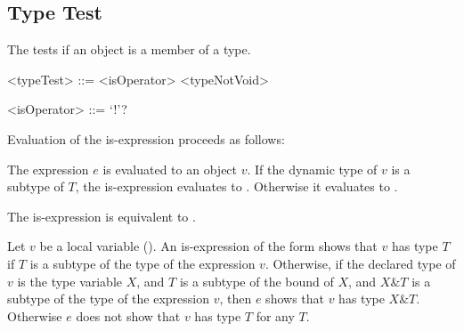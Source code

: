 \documentclass[makeidx]{article}
\begin{document}
{\subsection{Type Test}

\LMHash{}%
The  tests if an object is a member of a type.

\begin{grammar}
<typeTest> ::= <isOperator> <typeNotVoid>

<isOperator> ::= \IS{} `!'?
\end{grammar}

\LMHash{}%
Evaluation of the is-expression  proceeds as follows:

\LMHash{}%
The expression $e$ is evaluated to an object $v$.
If the dynamic type of $v$ is a subtype of $T$,
the is-expression evaluates to \TRUE.
Otherwise it evaluates to \FALSE.


\LMHash{}%
The is-expression  is equivalent to .

\LMHash{}%
Let $v$ be a local variable ().
An is-expression of the form 
shows that $v$ has type $T$
if $T$ is a subtype of the type of the expression $v$.
%
Otherwise,
if the declared type of $v$ is the type variable $X$,
and $T$ is a subtype of the bound of $X$,
and $X \& T$ is a subtype of the type of the expression $v$,
then $e$ shows that $v$ has type $X \& T$.
%
Otherwise $e$ does not show that $v$ has type $T$ for any $T$.

}
\end{document}
